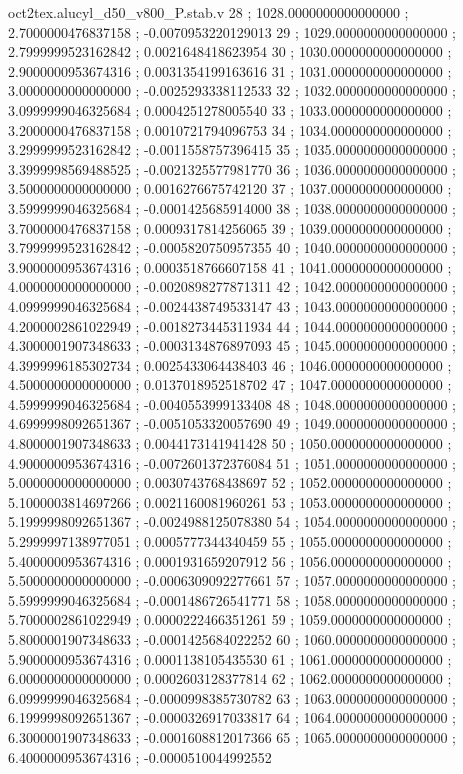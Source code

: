\begin{filecontents}[overwrite]{oct2tex.alucyl_d50_v800_P.stab.v}
28 ; 1028.0000000000000000 ; 2.7000000476837158 ; -0.0070953220129013
29 ; 1029.0000000000000000 ; 2.7999999523162842 ; 0.0021648418623954
30 ; 1030.0000000000000000 ; 2.9000000953674316 ; 0.0031354199163616
31 ; 1031.0000000000000000 ; 3.0000000000000000 ; -0.0025293338112533
32 ; 1032.0000000000000000 ; 3.0999999046325684 ; 0.0004251278005540
33 ; 1033.0000000000000000 ; 3.2000000476837158 ; 0.0010721794096753
34 ; 1034.0000000000000000 ; 3.2999999523162842 ; -0.0011558757396415
35 ; 1035.0000000000000000 ; 3.3999998569488525 ; -0.0021325577981770
36 ; 1036.0000000000000000 ; 3.5000000000000000 ; 0.0016276675742120
37 ; 1037.0000000000000000 ; 3.5999999046325684 ; -0.0001425685914000
38 ; 1038.0000000000000000 ; 3.7000000476837158 ; 0.0009317814256065
39 ; 1039.0000000000000000 ; 3.7999999523162842 ; -0.0005820750957355
40 ; 1040.0000000000000000 ; 3.9000000953674316 ; 0.0003518766607158
41 ; 1041.0000000000000000 ; 4.0000000000000000 ; -0.0020898277871311
42 ; 1042.0000000000000000 ; 4.0999999046325684 ; -0.0024438749533147
43 ; 1043.0000000000000000 ; 4.2000002861022949 ; -0.0018273445311934
44 ; 1044.0000000000000000 ; 4.3000001907348633 ; -0.0003134876897093
45 ; 1045.0000000000000000 ; 4.3999996185302734 ; 0.0025433064438403
46 ; 1046.0000000000000000 ; 4.5000000000000000 ; 0.0137018952518702
47 ; 1047.0000000000000000 ; 4.5999999046325684 ; -0.0040553999133408
48 ; 1048.0000000000000000 ; 4.6999998092651367 ; -0.0051053320057690
49 ; 1049.0000000000000000 ; 4.8000001907348633 ; 0.0044173141941428
50 ; 1050.0000000000000000 ; 4.9000000953674316 ; -0.0072601372376084
51 ; 1051.0000000000000000 ; 5.0000000000000000 ; 0.0030743768438697
52 ; 1052.0000000000000000 ; 5.1000003814697266 ; 0.0021160081960261
53 ; 1053.0000000000000000 ; 5.1999998092651367 ; -0.0024988125078380
54 ; 1054.0000000000000000 ; 5.2999997138977051 ; 0.0005777344340459
55 ; 1055.0000000000000000 ; 5.4000000953674316 ; 0.0001931659207912
56 ; 1056.0000000000000000 ; 5.5000000000000000 ; -0.0006309092277661
57 ; 1057.0000000000000000 ; 5.5999999046325684 ; -0.0001486726541771
58 ; 1058.0000000000000000 ; 5.7000002861022949 ; 0.0000222466351261
59 ; 1059.0000000000000000 ; 5.8000001907348633 ; -0.0001425684022252
60 ; 1060.0000000000000000 ; 5.9000000953674316 ; 0.0001138105435530
61 ; 1061.0000000000000000 ; 6.0000000000000000 ; 0.0002603128377814
62 ; 1062.0000000000000000 ; 6.0999999046325684 ; -0.0000998385730782
63 ; 1063.0000000000000000 ; 6.1999998092651367 ; -0.0000326917033817
64 ; 1064.0000000000000000 ; 6.3000001907348633 ; -0.0001608812017366
65 ; 1065.0000000000000000 ; 6.4000000953674316 ; -0.0000510044992552

\end{filecontents}
